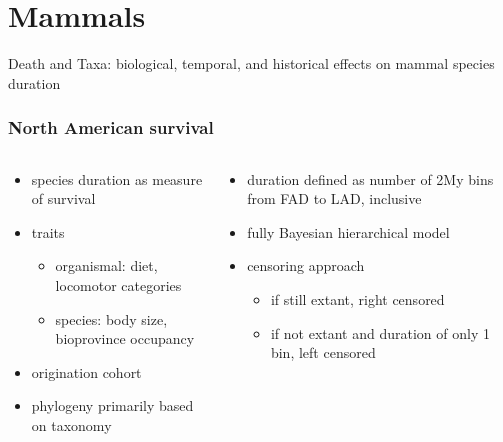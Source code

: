\documentclass{beamer}
\begin{document}
\section{Mammals}
\begin{frame}
Death and Taxa: biological, temporal, and historical effects on mammal species duration
\end{frame}

\begin{frame}
  \frametitle{North American survival}
  \begin{columns}
    \begin{column}{0.5\textwidth}
      \begin{itemize}
        \item species duration as measure of survival
        \item traits
          \begin{itemize}
            \item organismal: diet, locomotor categories
            \item species: body size, bioprovince occupancy
          \end{itemize}
        \item origination cohort
        \item phylogeny primarily based on taxonomy
      \end{itemize}
    \end{column}
    \begin{column}{0.5\textwidth}
      \begin{itemize}
        \item duration defined as number of 2My bins from FAD to LAD, inclusive
        \item fully Bayesian hierarchical model
        \item censoring approach
          \begin{itemize}
            \item if still extant, right censored
            \item if not extant and duration of only 1 bin, left censored
          \end{itemize}
      \end{itemize}
    \end{column}
  \end{columns}
\end{frame}
\end{document}
